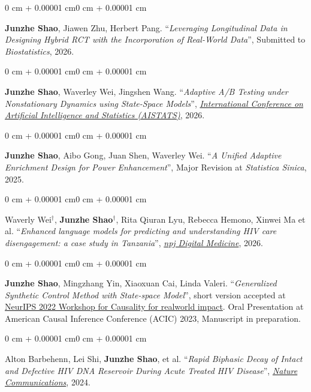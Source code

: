 \documentclass[10pt, letterpaper]{article}
\newenvironment{onecolentry}{
    \begin{adjustwidth}{0 cm + 0.00001 cm}{0 cm + 0.00001 cm}
}{\end{adjustwidth}}
\begin{document}
\begin{onecolentry}
    \textbf{Junzhe Shao}, Jiawen Zhu, Herbert Pang. ``\textit{Leveraging Longitudinal Data in Designing Hybrid RCT with the Incorporation of Real-World Data}'', Submitted to \textit{Biostatistics}, 2026.
\end{onecolentry}
\vspace{0.20 cm}

\begin{onecolentry}
    \textbf{Junzhe Shao}, Waverley Wei, Jingshen Wang. ``\textit{Adaptive A/B Testing under Nonstationary Dynamics using State-Space Models}'',  \href{https://virtual.aistats.org/virtual/2026/poster/10811}{\textit{International Conference on Artificial Intelligence and Statistics (AISTATS)}}, 2026.
\end{onecolentry}
\vspace{0.20 cm}
\begin{onecolentry}
    \textbf{Junzhe Shao}, Aibo Gong, Juan Shen, Waverley Wei. ``\textit{A Unified Adaptive Enrichment Design for Power Enhancement}'', Major Revision at \textit{Statistica Sinica}, 2025.
\end{onecolentry}
\vspace{0.20 cm}

\begin{onecolentry}
    Waverly Wei$^\dagger$, \textbf{Junzhe Shao}$^\dagger$, Rita Qiuran Lyu, Rebecca Hemono, Xinwei Ma et al. ``\textit{Enhanced language models for predicting and understanding HIV care disengagement: a case study in Tanzania}'', \href{https://www.nature.com/articles/s41746-026-02349-3}{\textit{npj Digital Medicine}}, 2026.
\end{onecolentry}
\vspace{0.20 cm}
\begin{onecolentry}
\textbf{Junzhe Shao}, Mingzhang Yin, Xiaoxuan Cai, Linda Valeri. ``\textit{Generalized Synthetic Control Method with State-space Model}'', short version accepted at \href{https://openreview.net/pdf?id=OwyiIBIFCrn}{NeurIPS 2022 Workshop for Causality for realworld impact}. Oral Presentation at American Causal Inference Conference (ACIC) 2023, Manuscript in preparation.
\end{onecolentry}

\vspace{0.20 cm}
\begin{onecolentry}
Alton Barbehenn, Lei Shi, \textbf{Junzhe Shao}, et al. ``\textit{Rapid Biphasic Decay of Intact and Defective HIV DNA Reservoir During Acute Treated HIV Disease}'', \href{https://www.nature.com/articles/s41467-024-54116-1}{\textit{Nature Communications}}, 2024.
\end{onecolentry}
\vspace{0.20 cm}
\end{document}
